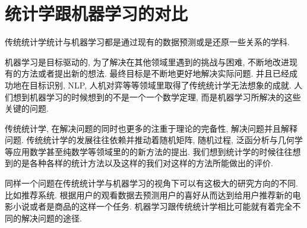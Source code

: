\documentclass[lang=cn,11pt,a4paper]{elegantpaper}
\begin{document}
\section{统计学跟机器学习的对比}
\par 传统统计学统计与机器学习都是通过现有的数据预测或是还原一些关系的学科. 
\par 机器学习是目标驱动的, 为了解决在其他领域里遇到的挑战与困难, 不断地改进现有的方法或者提出新的想法. 最终目标是不断地更好地解决实际问题. 并且已经成功地在目标识别, NLP, 人机对弈等等领域里取得了传统统计学无法想象的成就. 人们想到机器学习的时候想到的不是一个一个数学定理, 而是机器学习所解决的这些关键的问题. 
\par 传统统计学, 在解决问题的同时也更多的注重于理论的完备性, 解决问题并且解释问题. 传统统计学的发展往往依赖并推动着随机矩阵, 随机过程, 泛函分析与几何学等应用数学甚至纯数学等领域里的的新方法的提出. 我们想到统计学的时候往往想到的是各种各样的统计方法以及这样的我们对这样的方法所能做出的评价.
\par 同样一个问题在传统统计学与机器学习的视角下可以有这极大的研究方向的不同. 比如推荐系统. 根据用户的观看数据去预测用户的喜好从而达到给用户推荐新的电影小说或者是商品的这样一个任务. 机器学习跟传统统计学相比可能就有着完全不同的解决问题的途径.
\end{document}
